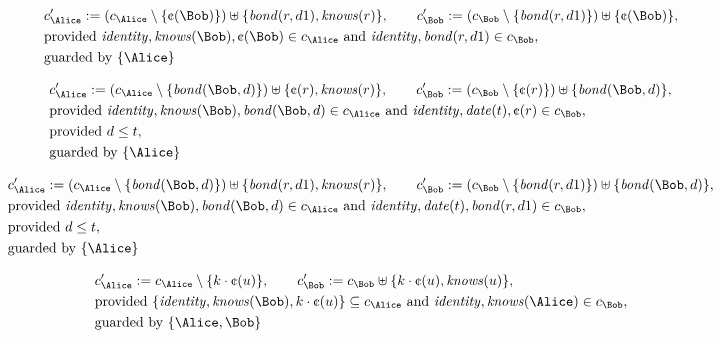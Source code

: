 \begin{align*}
&
c'_
{
\Alice
}
 := 
(c_
{
\Alice
}
 \setminus 
\{
\text{\textcent}
(
\Bob
)
\}
) \uplus 
\{
\mathit{
bond
}
(
r
,
d1
)
,
\mathit{
knows
}
(
r
)
\}
, \qquad 
c'_
{
\Bob
}
 := 
(c_
{
\Bob
}
 \setminus 
\{
\mathit{
bond
}
(
r
,
d1
)
\}
) \uplus 
\{
\text{\textcent}
(
\Bob
)
\}
,\\
&
\text{provided } 
\mathit{
identity
}
,
\mathit{
knows
}
(
\Bob
)
,
\text{\textcent}
(
\Bob
)
 \in c_
{
\Alice
}
 \text{ and } 
\mathit{
identity
}
,
\mathit{
bond
}
(
r
,
d1
)
 \in c_
{
\Bob
}
,\\
&
\text{guarded by } \{
\Alice
\}
\end{align*}

\begin{align*}
&
c'_
{
\Alice
}
 := 
(c_
{
\Alice
}
 \setminus 
\{
\mathit{
bond
}
(
\Bob
,
d
)
\}
) \uplus 
\{
\text{\textcent}
(
r
)
,
\mathit{
knows
}
(
r
)
\}
, \qquad 
c'_
{
\Bob
}
 := 
(c_
{
\Bob
}
 \setminus 
\{
\text{\textcent}
(
r
)
\}
) \uplus 
\{
\mathit{
bond
}
(
\Bob
,
d
)
\}
,\\
&
\text{provided } 
\mathit{
identity
}
,
\mathit{
knows
}
(
\Bob
)
,
\mathit{
bond
}
(
\Bob
,
d
)
 \in c_
{
\Alice
}
 \text{ and } 
\mathit{
identity
}
,
\mathit{
date
}
(
t
)
,
\text{\textcent}
(
r
)
 \in c_
{
\Bob
}
,\\
&
\text{provided } 
d
\le
t
,\\
&
\text{guarded by } \{
\Alice
\}
\end{align*}

\begin{align*}
&
c'_
{
\Alice
}
 := 
(c_
{
\Alice
}
 \setminus 
\{
\mathit{
bond
}
(
\Bob
,
d
)
\}
) \uplus 
\{
\mathit{
bond
}
(
r
,
d1
)
,
\mathit{
knows
}
(
r
)
\}
, \qquad 
c'_
{
\Bob
}
 := 
(c_
{
\Bob
}
 \setminus 
\{
\mathit{
bond
}
(
r
,
d1
)
\}
) \uplus 
\{
\mathit{
bond
}
(
\Bob
,
d
)
\}
,\\
&
\text{provided } 
\mathit{
identity
}
,
\mathit{
knows
}
(
\Bob
)
,
\mathit{
bond
}
(
\Bob
,
d
)
 \in c_
{
\Alice
}
 \text{ and } 
\mathit{
identity
}
,
\mathit{
date
}
(
t
)
,
\mathit{
bond
}
(
r
,
d1
)
 \in c_
{
\Bob
}
,\\
&
\text{provided } 
d
\le
t
,\\
&
\text{guarded by } \{
\Alice
\}
\end{align*}

\begin{align*}
&
c'_
{
\Alice
}
 := 
c_
{
\Alice
}
 \setminus 
\{
k
\cdot
\text{\textcent}
(
u
)
\}
, \qquad 
c'_
{
\Bob
}
 := 
c_
{
\Bob
}
 \uplus 
\{
k
\cdot
\text{\textcent}
(
u
)
,
\mathit{
knows
}
(
u
)
\}
,\\
&
\text{provided } 
\{
\mathit{
identity
}
,
\mathit{
knows
}
(
\Bob
)
,
k
\cdot
\text{\textcent}
(
u
)
\}
 \subseteq c_
{
\Alice
}
 \text{ and } 
\mathit{
identity
}
,
\mathit{
knows
}
(
\Alice
)
 \in c_
{
\Bob
}
,\\
&
\text{guarded by } \{
\Alice
,
\Bob
\}
\end{align*}
